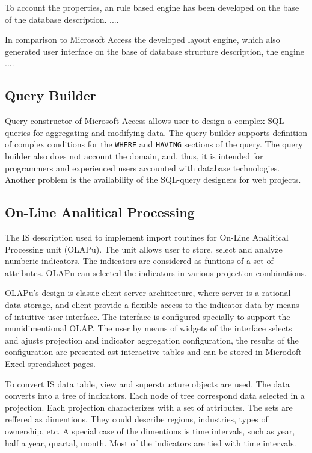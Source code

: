 \documentclass[conference]{IEEEtran}
\begin{document}
To account the properties, an rule based engine has been developed on the base of the database description.  ....


In comparison to Microsoft Access the developed layout engine, which also generated user interface on the base of database structure description, the engine ....

\subsection{Query Builder}
\label{sec:query-builder}


Query constructor of Microsoft Access allows user to design a complex SQL-queries for aggregating and modifying data.  The query builder supports definition of complex conditions for the \texttt{WHERE} and \texttt{HAVING} sections of the query.  The query builder also does not account the domain, and, thus, it is intended for programmers and experienced users accounted with database technologies.  Another problem is the availability of the SQL-query designers for web projects.



\subsection{On-Line Analitical Processing}
\label{sec:olap}

The IS description used to implement import routines for On-Line Analitical Processing unit (OLAPu).  The unit allows user to store, select and analyze numberic indicators.  The indicators are considered as funtions of a set of attributes.  OLAPu can
selected the indicators in various projection combinations.

OLAPu's design is classic client-server architecture, where server is a rational data storage, and client provide a flexible access to the indicator data by means of intuitive user interface.  The interface is configured specially to support the munidimentional OLAP.  The user by means of widgets of the interface selects and ajusts projection and indicator aggregation configuration, the results of the configuration are presented ast interactive tables and can be stored in Microdoft Excel spreadsheet pages.

To convert IS data {table}, {view} and {superstructure} objects are used.  The data converts into a tree of indicators.  Each node of tree correspond data selected in a projection.  Each projection characterizes with a set of attributes.  The sets are reffered as dimentions.  They could describe regions, industries, types of ownership, etc.  A special case of the dimentions is time intervals, such as year, half a year, quartal, month.  Most of the indicators are tied with time intervals.
\end{document}
